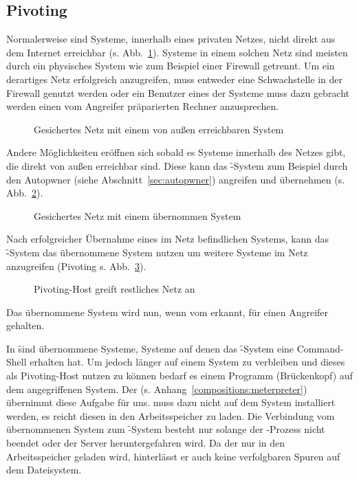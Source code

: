 
\clearpage
\subsection{Pivoting}
\label{sec:pivoting}

Normalerweise sind Systeme, innerhalb eines privaten Netzes, nicht direkt aus
dem Internet erreichbar (s. Abb.~\ref{fig:pivot1}). Systeme in einem solchen
Netz sind meisten durch ein physisches System wie zum Beispiel einer Firewall
getrennt. Um ein derartiges Netz erfolgreich anzugreifen, muss entweder eine
Schwachstelle in der Firewall genutzt werden oder ein Benutzer eines der
Systeme muss dazu gebracht werden einen vom Angreifer präparierten Rechner
anzusprechen.

\begin{figure}
	\centering {}
	\caption{Gesichertes Netz mit einem von außen erreichbaren System}
  \label{fig:pivot1}
\end{figure}

Andere Möglichkeiten eröffnen sich sobald es Systeme innerhalb des Netzes
gibt, die direkt von außen erreichbar sind. Diese kann das \f-System zum
Beispiel durch den Autopwner (siehe Abschnitt~\ref{sec:autopwner}) angreifen und
übernehmen (s. Abb.~\ref{fig:pivot2}).

\begin{figure}
	\centering {}
	\caption{Gesichertes Netz mit einem übernommen System}
  \label{fig:pivot2}
\end{figure}

Nach erfolgreicher Übernahme eines im Netz befindlichen Systems, kann das
\f-System das übernommene System nutzen um weitere Systeme im Netz
anzugreifen (Pivoting s. Abb.~\ref{fig:pivot3}).

\begin{figure}
	\centering {}
	\caption{Pivoting-Host greift restliches Netz an}
  \label{fig:pivot3}
\end{figure}

Das übernommene System wird nun, wenn vom  erkannt, für einen
Angreifer gehalten.

In \f sind übernommene Systeme, Systeme auf denen das \f-System eine
Command-Shell erhalten hat. Um jedoch länger auf einem System zu verbleiben
und dieses als Pivoting-Host nutzen zu können bedarf es einem Programm
(Brückenkopf) auf dem angegriffenen System. Der  (s.
Anhang~\ref{compositions:meterpreter}) übernimmt diese Aufgabe für uns.
 muss dazu nicht auf dem System installiert werden, es reicht
diesen in den Arbeitsspeicher zu laden. Die Verbindung vom übernommenen
System zum \f-System besteht nur solange der -Prozess nicht
beendet oder der Server heruntergefahren wird. Da der  nur in den
Arbeitsspeicher geladen wird, hinterlässt er auch keine verfolgbaren
Spuren auf dem Dateisystem.


